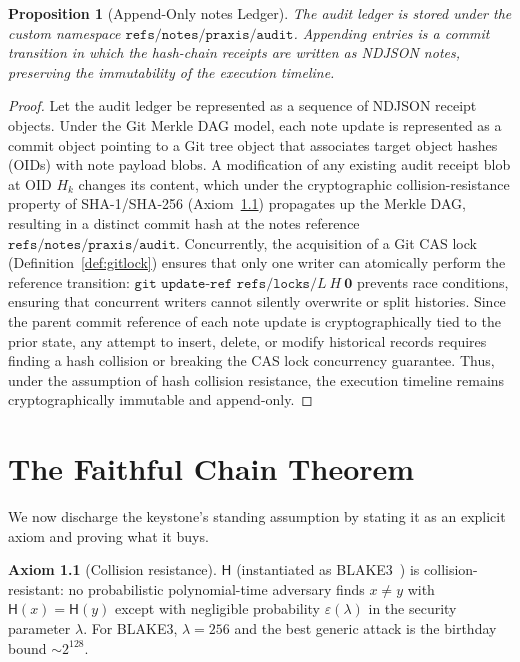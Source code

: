 \documentclass[11pt,oneside]{book}
\theoremstyle{definition}
\newtheorem{axiom}{Axiom}[chapter]
\theoremstyle{plain}
\newtheorem{proposition}[theorem]{Proposition}
\theoremstyle{remark}
\newcommand{\chainH}{\mathsf{H}}               %
\newcommand{\code}[1]{\texttt{#1}}
\begin{document}
\begin{proposition}[Append-Only notes Ledger]\label{prop:notesledger}
The audit ledger is stored under the custom namespace $\code{refs/notes/praxis/audit}$. %
Appending entries is a commit transition in which the hash-chain receipts are written as NDJSON notes, preserving the immutability of the execution timeline. %
\end{proposition}
\begin{proof}
Let the audit ledger be represented as a sequence of NDJSON receipt objects. %
Under the Git Merkle DAG model, each note update is represented as a commit object pointing to a Git tree object that associates target object hashes (OIDs) with note payload blobs. %
A modification of any existing audit receipt blob at OID $H_k$ changes its content, which under the cryptographic collision-resistance property of SHA-1/SHA-256 (Axiom~\ref{ax:cr}) propagates up the Merkle DAG, resulting in a distinct commit hash at the notes reference $\code{refs/notes/praxis/audit}$. %
Concurrently, the acquisition of a Git CAS lock (Definition~\ref{def:gitlock}) ensures that only one writer can atomically perform the reference transition: $\code{git update-ref refs/locks/}L\ H\ \bm 0$ prevents race conditions, ensuring that concurrent writers cannot silently overwrite or split histories. %
Since the parent commit reference of each note update is cryptographically tied to the prior state, any attempt to insert, delete, or modify historical records requires finding a hash collision or breaking the CAS lock concurrency guarantee. %
Thus, under the assumption of hash collision resistance, the execution timeline remains cryptographically immutable and append-only. %
\end{proof}

\chapter{The Faithful Chain Theorem}
\label{ch:faithful}

We now discharge the keystone's standing assumption by stating it as an explicit axiom and proving what it buys. %

\begin{axiom}[Collision resistance]\label{ax:cr}
$\chainH$ (instantiated as BLAKE3~\cite{blake3}) is collision-resistant: no probabilistic polynomial-time adversary finds $x\ne y$ with $\chainH(x)=\chainH(y)$ except with negligible probability $\varepsilon(\lambda)$ in the security parameter $\lambda$. %
For BLAKE3, $\lambda=256$ and the best generic attack is the birthday bound $\sim 2^{128}$. %
\end{axiom}
\end{document}
